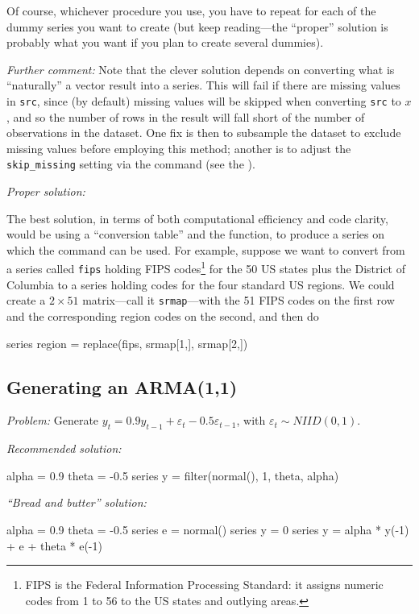 Of course, whichever procedure you use, you have to repeat for each of
the dummy series you want to create (but keep reading---the ``proper''
solution is probably what you want if you plan to create several
dummies).

\emph{Further comment:} Note that the clever solution depends on
converting what is ``naturally'' a vector result into a series. This
will fail if there are missing values in \texttt{src}, since (by
default) missing values will be skipped when converting \texttt{src}
to $x$, and so the number of rows in the result will fall short of the
number of observations in the dataset. One fix is then to subsample
the dataset to exclude missing values before employing this method;
another is to adjust the \texttt{skip\_missing} setting via the
 command (see the \GCR).

\emph{Proper solution:}

The best solution, in terms of both computational efficiency and code
clarity, would be using a ``conversion table'' and the 
function, to produce a series on which the  command can
be used. For example, suppose we want to convert from a series called
\texttt{fips} holding FIPS codes\footnote{FIPS is the Federal
  Information Processing Standard: it assigns numeric codes from 1 to
  56 to the US states and outlying areas.} for the 50 US states plus
the District of Columbia to a series holding codes for the four
standard US regions. We could create a $2 \times 51$ matrix---call it
\texttt{srmap}---with the 51 FIPS codes on the first row and the
corresponding region codes on the second, and then do
\begin{code}
series region = replace(fips, srmap[1,], srmap[2,])
\end{code}

\subsection{Generating an ARMA(1,1)}

\emph{Problem:} Generate $y_t = 0.9 y_{t-1} + \varepsilon_t - 0.5
\varepsilon_{t-1}$, with $\varepsilon_t \sim N\!I\!I\!D(0,1)$.

\emph{Recommended solution:}
\begin{code}
alpha = 0.9
theta = -0.5
series y = filter(normal(), {1, theta}, alpha)
\end{code}

\emph{``Bread and butter'' solution:}
\begin{code}
alpha = 0.9
theta = -0.5
series e = normal()
series y = 0
series y = alpha * y(-1) + e + theta * e(-1)
\end{code}

